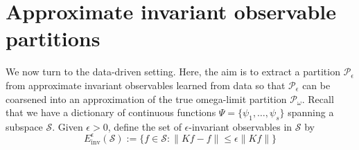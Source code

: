 \documentclass[letterpaper, 10 pt, conference]{ieeeconf}
\newcommand{\Ac}{\mathcal{A}}
\newcommand{\Pc}{\mathcal{P}}
\newcommand{\Sc}{\mathcal{S}}
\newcommand{\Xc}{\mathcal{X}}
\newtheorem{lemma}[theorem]{Lemma}
\begin{document}

\section{Approximate invariant observable partitions}
\label{sec:approximate_invariants}
We now turn to the data-driven setting. Here, the aim is to extract a partition $\Pc_{\epsilon}$ from approximate invariant observables learned from data so that $\Pc_{\epsilon}$ can be coarsened into an approximation of the true omega-limit partition $\mathcal P_\omega$. Recall that we have a dictionary of continuous functions $\Psi = \{\psi_1, \dots, \psi_s\}$ spanning a subspace $\Sc$. Given $\epsilon > 0$, define the set of $\epsilon$-invariant observables in $\Sc$ by
\begin{equation}
    E_{\text{inv}}^{\epsilon}(\Sc) := \{f\in\Sc: \| Kf - f \| \leq \epsilon \|Kf\| \}
\end{equation}
\end{document}
